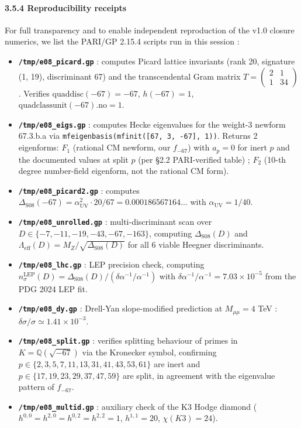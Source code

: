 \documentclass[
  11pt,
  a4paper,
]{article}
\begin{document}
\hypertarget{reproducibility-receipts}{%
\paragraph{3.5.4 Reproducibility receipts}\label{reproducibility-receipts}}

For full transparency and to enable independent reproduction of the v1.0 closure numerics, we list the PARI/GP 2.15.4 scripts run in this session :

\begin{itemize}
\item
  \textbf{\texttt{/tmp/e08\_picard.gp}} : computes Picard lattice invariants (rank 20, signature (1, 19), discriminant 67) and the transcendental Gram matrix \(T = \begin{pmatrix} 2 & 1 \\ 1 & 34 \end{pmatrix}\). Verifies \(\mathrm{quaddisc}(-67) = -67\), \(h(-67) = 1\), \(\mathrm{quadclassunit}(-67).\mathrm{no} = 1\).
\item
  \textbf{\texttt{/tmp/e08\_eigs.gp}} : computes Hecke eigenvalues for the weight-3 newform 67.3.b.a via \texttt{mfeigenbasis(mfinit({[}67,\ 3,\ -67{]},\ 1))}. Returns 2 eigenforms: \(F_1\) (rational CM newform, our \(f_{-67}\)) with \(a_p = 0\) for inert \(p\) and the documented values at split \(p\) (per §2.2 PARI-verified table) ; \(F_2\) (10-th degree number-field eigenform, not the rational CM form).
\item
  \textbf{\texttt{/tmp/e08\_picard2.gp}} : computes \(\Delta_{\mathrm{S08}}(-67) = \alpha_{\mathrm{UV}}^2 \cdot 20 / 67 = 0.000186567164...\) with \(\alpha_{\mathrm{UV}} = 1/40\).
\item
  \textbf{\texttt{/tmp/e08\_unrolled.gp}} : multi-discriminant scan over \(D \in \{-7, -11, -19, -43, -67, -163\}\), computing \(\Delta_{\mathrm{S08}}(D)\) and \(\Lambda_{\mathrm{eff}}(D) = M_Z/\sqrt{\Delta_{\mathrm{S08}}(D)}\) for all 6 viable Heegner discriminants.
\item
  \textbf{\texttt{/tmp/e08\_lhc.gp}} : LEP precision check, computing \(n_\sigma^{\mathrm{LEP}}(D) = \Delta_{\mathrm{S08}}(D)/(\delta\alpha^{-1}/\alpha^{-1})\) with \(\delta\alpha^{-1}/\alpha^{-1} = 7.03 \times 10^{-5}\) from the PDG 2024 LEP fit.
\item
  \textbf{\texttt{/tmp/e08\_dy.gp}} : Drell-Yan slope-modified prediction at \(M_{\mu\mu} = 4\) TeV : \(\delta\sigma/\sigma \simeq 1.41 \times 10^{-3}\).
\item
  \textbf{\texttt{/tmp/e08\_split.gp}} : verifies splitting behaviour of primes in \(K = \mathbb Q(\sqrt{-67})\) via the Kronecker symbol, confirming \(p \in \{2, 3, 5, 7, 11, 13, 31, 41, 43, 53, 61\}\) are inert and \(p \in \{17, 19, 23, 29, 37, 47, 59\}\) are split, in agreement with the eigenvalue pattern of \(f_{-67}\).
\item
  \textbf{\texttt{/tmp/e08\_multid.gp}} : auxiliary check of the K3 Hodge diamond (\(h^{0,0} = h^{2,0} = h^{0,2} = h^{2,2} = 1\), \(h^{1,1} = 20\), \(\chi(K3) = 24\)).
\end{itemize}
\end{document}
